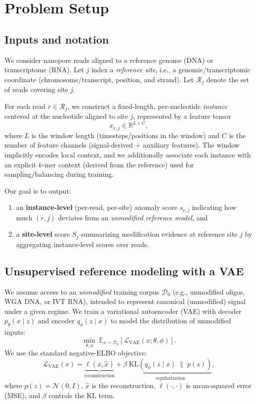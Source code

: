 \documentclass[journal,article,submit,pdftex,moreauthors]{Definitions/mdpi}
\begin{document}
\section{Problem Setup}
\subsection{Inputs and notation}
We consider nanopore reads aligned to a reference genome (DNA) or transcriptome (RNA). Let $j$
index a \emph{reference site}, i.e., a genomic/transcriptomic coordinate (chromosome/transcript,
position, and strand). Let $\mathcal{R}_j$ denote the set of reads covering site $j$.

For each read $r \in \mathcal{R}_j$, we construct a fixed-length, per-nucleotide \emph{instance}
centered at the nucleotide aligned to site $j$, represented by a feature tensor
\begin{equation}
x_{r,j} \in \mathbb{R}^{L \times C},
\end{equation}
where $L$ is the window length (timesteps/positions in the window) and $C$ is the number of
feature channels (signal-derived + auxiliary features). The window implicitly encodes local context,
and we additionally associate each instance with an explicit $k$-mer context (derived from the
reference) used for sampling/balancing during training.

Our goal is to output:
\begin{enumerate}
    \item an \textbf{instance-level} (per-read, per-site) anomaly score $s_{r,j}$ indicating how much
    $(r,j)$ deviates from an \emph{unmodified reference model}, and
    \item a \textbf{site-level} score $S_j$ summarizing modification evidence at reference site $j$
    by aggregating instance-level scores over reads.
\end{enumerate}

\subsection{Unsupervised reference modeling with a VAE}
We assume access to an \emph{unmodified} training corpus $\mathcal{D}_0$ (e.g., unmodified oligos,
WGA DNA, or IVT RNA), intended to represent canonical (unmodified) signal under a given regime.
We train a variational autoencoder (VAE) with decoder $p_\theta(x \mid z)$ and encoder
$q_\phi(z \mid x)$ to model the distribution of unmodified inputs:
\begin{equation}
\min_{\theta,\phi}\; \mathbb{E}_{x \sim \mathcal{D}_0}\left[\mathcal{L}_{\mathrm{VAE}}(x; \theta,\phi)\right].
\end{equation}
We use the standard negative-ELBO objective:
\begin{equation}
\mathcal{L}_{\mathrm{VAE}}(x)
=
\underbrace{\ell\!\left(x,\hat{x}\right)}_{\text{reconstruction}}
+
\beta\;
\underbrace{\mathrm{KL}\!\left(q_\phi(z \mid x)\;\|\;p(z)\right)}_{\text{regularization}},
\end{equation}
where $p(z)=\mathcal{N}(0,I)$, $\hat{x}$ is the reconstruction, $\ell(\cdot,\cdot)$ is mean-squared
error (MSE), and $\beta$ controls the KL term.
\end{document}
